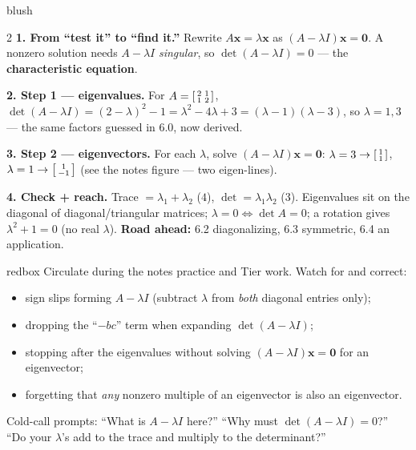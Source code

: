 \documentclass[10pt]{article}
\newcommand{\xx}{\mathbf{x}}
\newcommand{\zero}{\mathbf{0}}
\begin{document}
\begin{skillbox}[Lesson]{blush}
\begin{multicols}{2}
\textbf{1. From ``test it'' to ``find it.''} Rewrite $A\xx=\lambda\xx$ as $(A-\lambda I)\xx=\zero$.
A nonzero solution needs $A-\lambda I$ \emph{singular}, so $\det(A-\lambda I)=0$ --- the
\textbf{characteristic equation}.

\textbf{2. Step 1 --- eigenvalues.} For $A=\begin{bsmallmatrix}2&1\\1&2\end{bsmallmatrix}$,
$\det(A-\lambda I)=(2-\lambda)^2-1=\lambda^2-4\lambda+3=(\lambda-1)(\lambda-3)$, so $\lambda=1,3$ ---
the same factors guessed in 6.0, now derived.

\columnbreak

\textbf{3. Step 2 --- eigenvectors.} For each $\lambda$, solve $(A-\lambda I)\xx=\zero$: $\lambda=3\to
\begin{bsmallmatrix}1\\1\end{bsmallmatrix}$, $\lambda=1\to\begin{bsmallmatrix}1\\-1\end{bsmallmatrix}$
(see the notes figure --- two eigen-lines).

\textbf{4. Check + reach.} Trace $=\lambda_1+\lambda_2$ ($4$), $\det=\lambda_1\lambda_2$ ($3$).
Eigenvalues sit on the diagonal of diagonal/triangular matrices; $\lambda=0\Leftrightarrow\det A=0$; a
rotation gives $\lambda^2+1=0$ (no real $\lambda$). \textbf{Road ahead:} 6.2 diagonalizing, 6.3
symmetric, 6.4 an application.
\end{multicols}
\end{skillbox}

\begin{skillbox}{redbox}
Circulate during the notes practice and Tier work. Watch for and correct:
\begin{itemize}[leftmargin=1.2em, nosep]
  \item sign slips forming $A-\lambda I$ (subtract $\lambda$ from \emph{both} diagonal entries only);
  \item dropping the ``$-bc$'' term when expanding $\det(A-\lambda I)$;
  \item stopping after the eigenvalues without solving $(A-\lambda I)\xx=\zero$ for an eigenvector;
  \item forgetting that \emph{any} nonzero multiple of an eigenvector is also an eigenvector.
\end{itemize}
Cold-call prompts: ``What is $A-\lambda I$ here?'' ``Why must $\det(A-\lambda I)=0$?'' ``Do your
$\lambda$'s add to the trace and multiply to the determinant?''
\end{skillbox}
\end{document}
